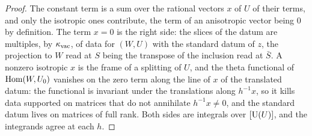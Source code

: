 \begin{proof}
The constant term is a sum over the rational vectors $x$ of $U$ of their terms, and only the isotropic ones contribute, the term of an anisotropic vector being $0$ by definition. The term $x=0$ is the right
side: the slices of the datum are multiples, by $\kappa_{\rm vac}$, of data for $(W,U)$ with the standard datum of $z$, the projection to $W$ read at $S$ being the transpose of the inclusion read at $\bar S$. A
nonzero isotropic $x$ is the frame of a splitting of $U$, and the theta functional of $\operatorname{Hom}(W,U_0)$ vanishes on the zero term along the line of $x$ of the translated datum: the functional is invariant under the
translations along $h^{-1}x$, so it kills data supported on matrices that do not annihilate $h^{-1}x\ne0$, and the standard datum lives on matrices of full rank. Both sides are integrals over $[\operatorname{U}(U)]$, and the
integrands agree at each $h$.
\end{proof}

